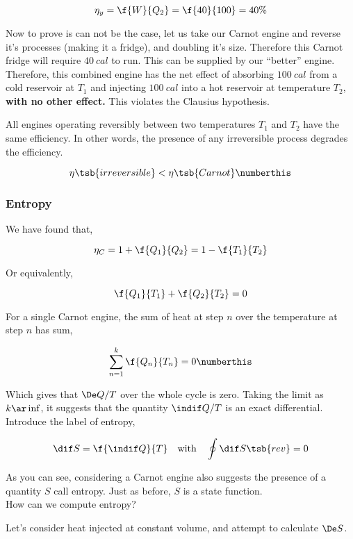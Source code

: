 \documentclass{article}
\begin{document}
\[ \eta_y = \f{W}{Q_2} = \f{40}{100} = 40\% \]

Now to prove is can not be the case, let us take our Carnot engine and reverse it's processes (making it a fridge), and doubling it's size. Therefore this Carnot fridge will require $\SI{40}{cal}$ to run. This can be supplied by our ``better'' engine. Therefore, this combined engine has the net effect of absorbing $\SI{100}{cal}$ from a cold reservoir at $T_1$ and injecting $\SI{100}{cal}$ into a hot reservoir at temperature $T_2$, \textbf{with no other effect.} This violates the Clausius hypothesis.


All engines operating reversibly between two temperatures $T_1$ and $T_2$ have the same efficiency. In other words, the presence of any irreversible process degrades the efficiency.

\[ \eta\tsb{irreversible} < \eta\tsb{Carnot} \numberthis \label{eq:irreversiblecarnot}\]

\subsubsection{Entropy}

We have found that,

\[ \eta_C = 1 + \f{Q_1}{Q_2} = 1 - \f{T_1}{T_2} \]

Or equivalently,

\[ \f{Q_1}{T_1} + \f{Q_2}{T_2} = 0 \]

For a single Carnot engine, the sum of heat at step $n$ over the temperature at step $n$ has sum,

\[  \sum_{n=1}^{k} \f{Q_n}{T_n} = 0 \numberthis \label{eq:revcarnot}\]

Which gives that $\De Q / T$ over the whole cycle is zero. Taking the limit as $k \ar \inf$, it suggests that the quantity $\indif Q / T$ is an exact differential. Introduce the label of entropy,

\[ \dif S = \f{\indif Q}{T} \quad \text{with} \quad \oint \dif S\tsb{rev} = 0  \]

As you can see, considering a Carnot engine also suggests the presence of a quantity $S$ call entropy. Just as before, $S$ is a state function. \\

How can we compute entropy? \\


Let's consider heat injected at constant volume, and attempt to calculate $\De S$.
\end{document}
